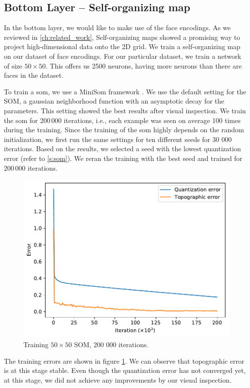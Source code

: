 \subsection{Bottom Layer -- Self-organizing map}

In the bottom layer, we would like to make use of the face encodings. As we reviewed in \autoref{ch:related_work}, Self-organizing maps showed a promising way to project high-dimensional data onto the 2D grid. We train a self-organizing map on our dataset of face encodings. For our particular dataset, we train a network of size $50\times 50$. This offers us 2500 neurons, having more neurons than there are faces in the dataset.

To train a \acrshort{som}, we use a MiniSom framework \citep{vettigli2013minisom}. We use the default setting for the SOM, a gaussian neighborhood function with an asymptotic decay for the parameters. This setting showed the best results after visual inspection. We train the \acrshort{som} for 200\,000 iterations, i.e., each example was seen on average 100 times during the training. Since the training of the \acrshort{som} highly depends on the random initialization, we first run the same settings for ten different seeds for 30 000 iterations. Based on the results, we selected a seed with the lowest quantization error (refer to \autoref{s:som}). We reran the training with the best seed and trained for 200\,000 iterations.

\begin{figure}
    \centering
    \includegraphics[width=0.8\linewidth]{graphs/som_errors.pdf}
    \caption{Training $50\times50$ SOM, 200 000 iterations.}
    \label{fig:som_training}
\end{figure}

The training errors are shown in figure \ref{fig:som_training}. We can observe that topographic error is at this stage stable. Even though the quantization error has not converged yet, at this stage, we did not achieve any improvements by our visual inspection.

